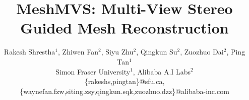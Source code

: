\documentclass[10pt,twocolumn,letterpaper]{article}
\begin{document}
\title{MeshMVS: Multi-View Stereo Guided Mesh Reconstruction}

\author{
    \small
    Rakesh Shrestha$^{1}$, Zhiwen Fan$^{2}$, Siyu Zhu$^{2}$, Qingkun Su$^{2}$, Zuozhuo Dai$^{2}$, Ping Tan$^{1}$ \\
    \normalsize{Simon Fraser University$^{1}$},
    \normalsize{Alibaba A.I Labs$^{2}$} \\
    \scriptsize{\{rakeshs,pingtan\}@sfu.ca, \{waynefan.fzw,siting.zsy,qingkun.sqk,zuozhuo.dzz\}@alibaba-inc.com}
}

\maketitle
\ificcvfinal\thispagestyle{empty}\fi

\newcommand{\todo}[1]{{\textcolor{red}{\bf [#1]}}}

\newcommand{\figref}[1]{Figure~\ref{fig:#1}}
\newcommand{\tabref}[1]{Table~\ref{tab:#1}}
\newcommand{\equref}[1]{Equation~(\ref{equ:#1})}
\newcommand{\secref}[1]{Section~\ref{sec:#1}}
\newcommand{\subsecref}[1]{Sub-section~\ref{subsec:#1}}
\newcommand{\tableref}[1]{Table~\ref{table:#1}}








{\small


}
\end{document}
